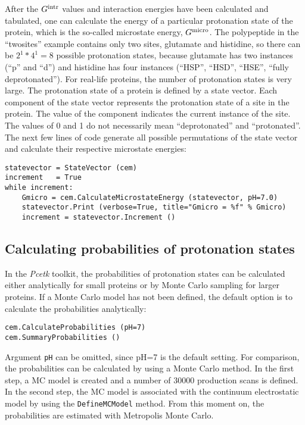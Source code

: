 \documentclass[12pt]{article}
\newcommand{\modulename}{\textit{Pcetk}\xspace}
\begin{document}
{After the $G^{\rm intr}$ values and interaction energies have been calculated and tabulated,
one can calculate the energy of a particular protonation state of the protein,
which is the so-called microstate energy,
$G^{\rm micro}$.
%
The polypeptide in the ``twosites'' example contains only two sites,
glutamate and histidine,
so there can be $2^1 * 4^1 = 8$ possible protonation states,
because glutamate has two
instances (``p'' and ``d'')
and histidine has four instances (``HSP'', ``HSD'', ``HSE'', ``fully deprotonated'').
%
For real-life proteins, the number of protonation states is very large.
%
The protonation state of a protein is defined by a state vector.
%
Each component of the state vector represents the protonation state of a site in the protein.
%
The value of the component indicates the current instance of the site.
%
The values of 0 and 1 do not necessarily mean ``deprotonated'' and ``protonated''.
%
The next few lines of code generate all possible permutations of the state vector and calculate
their respective microstate energies:

{\footnotesize \singlespacing \begin{lstlisting}
statevector = StateVector (cem)
increment   = True
while increment:
    Gmicro = cem.CalculateMicrostateEnergy (statevector, pH=7.0)
    statevector.Print (verbose=True, title="Gmicro = %f" % Gmicro)
    increment = statevector.Increment ()
\end{lstlisting} }


\subsection{Calculating probabilities of protonation states}
In the \modulename toolkit,
the probabilities of protonation states
can be calculated either analytically for small proteins
or by Monte Carlo sampling for larger proteins.
%
If a Monte Carlo model has not been defined,
the default option is to calculate the probabilities analytically:

{\footnotesize \singlespacing \begin{lstlisting}
cem.CalculateProbabilities (pH=7)
cem.SummaryProbabilities ()
\end{lstlisting} }

\bigskip
Argument {\tt pH} can be omitted,
since pH=7 is the default setting.
%
For comparison,
the probabilities can be calculated by using a Monte Carlo method.
%
In the first step,
a MC model is created and a number of 30000 production scans is defined.
%
In the second step,
the MC model is associated with the continuum electrostatic model
by using the {\tt DefineMCModel} method.
%
From this moment on,
the probabilities are estimated with Metropolis Monte Carlo.

}
\end{document}
